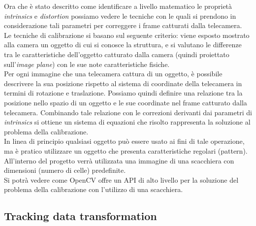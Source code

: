 Ora che è stato descritto come identificare a livello matematico le proprietà \textit{intrinsics} e \textit{distortion} possiamo vedere le tecniche con le quali si prendono in considerazione tali parametri per correggere i frame catturati dalla telecamera.\\
Le tecniche di calibrazione si basano sul seguente criterio: viene esposto mostrato alla camera un oggetto di cui si conosce la struttura, e si valutano le differenze tra le caratteristiche dell'oggetto catturato dalla camera (quindi proiettato sull'\textit{image plane}) con le sue note caratteristiche fisiche. \\Per ogni immagine che una telecamera cattura di un oggetto, è possibile descrivere la sua posizione rispetto al sistema di coordinate della telecamera in termini di rotazione e traslazione. Possiamo quindi definire una relazione tra la posizione nello spazio di un oggetto e le sue coordinate nel frame catturato dalla telecamera. Combinando tale relazione con le correzioni derivanti dai parametri di \textit{intrinsics} si ottiene un sistema di equazioni che risolto rappresenta la soluzione al problema della calibrazione.\\
In linea di principio qualsiasi oggetto può essere usato ai fini di tale operazione, ma è pratico utilizzare un oggetto che presenta caratteristiche regolari (pattern). All'interno del progetto verrà utilizzata una immagine di una scacchiera con dimensioni (numero di celle) predefinite.  \\
Si potrà vedere come OpenCV offre un API di alto livello per la soluzione del problema della calibrazione con l'utilizzo di una scacchiera.

\subsection{Tracking data transformation}

